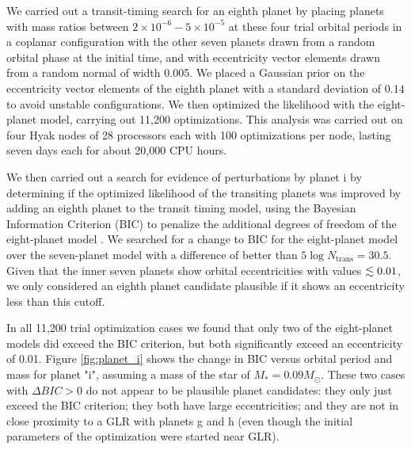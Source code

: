 \documentclass[twocolumn]{aastex63}
\begin{document}
We carried out a transit-timing search for an eighth planet by placing
planets with mass ratios between $2\times 10^{-6}-5\times 10^{-5}$ at 
these four trial orbital periods
in a coplanar configuration with the other seven planets drawn from
a random orbital phase at the initial time, and with eccentricity
vector elements drawn from a random normal of width 0.005.   We
placed a Gaussian prior on the eccentricity vector elements of the eighth planet
with a standard deviation of $0.14$ to avoid unstable configurations.
We then optimized the likelihood with the eight-planet model, carrying
out 11,200 optimizations.  This analysis was carried out on four Hyak nodes of 28 processors each with 100 optimizations per node, lasting seven days each for about 20,000 CPU hours.

We then carried out a search for evidence of perturbations by planet i by
determining if the optimized likelihood of the transiting planets was improved
by adding an eighth planet to the transit timing model, using
the Bayesian Information Criterion (BIC) to penalize the additional degrees
of freedom of the eight-planet model \citep{Wit2012}.  We searched for a change 
to BIC for the eight-planet model over the seven-planet model with a difference
of better than $5\log{N_\mathrm{trans}} = 30.5$.  Given that the inner seven
planets show orbital eccentricities with values $\lesssim 0.01$, we only considered
an eighth planet candidate plausible if it shows an eccentricity less than
this cutoff.

In all 11,200 trial optimization cases we found that only two of the eight-planet models 
did exceed the BIC criterion, but both significantly exceed an eccentricity
of 0.01.  Figure  \ref{fig:planet_i} shows the change in BIC versus
orbital period and mass for planet "i", assuming a mass of the star
of $M_* = 0.09 M_\odot$.   These two cases with $\Delta BIC {>} 0$
do not appear to be plausible
planet candidates:  they only just exceed the BIC criterion;  they
both have large eccentricities; and they are not in close proximity to a
GLR with planets g and h (even though the initial parameters of the optimization were started near GLR).
\end{document}
